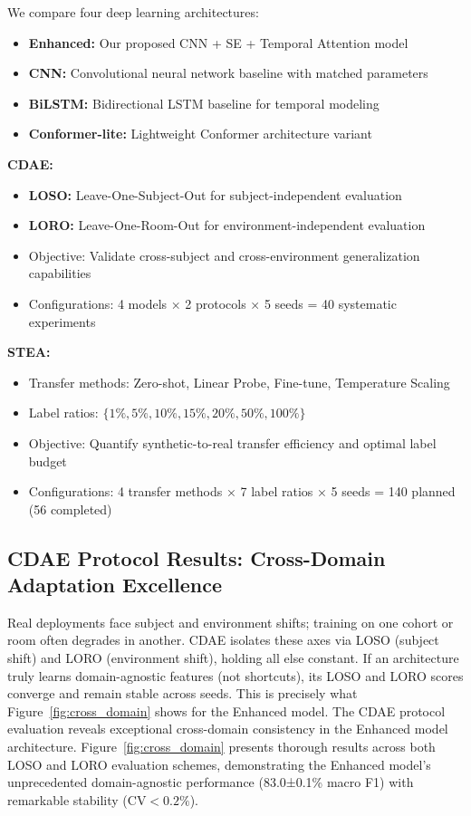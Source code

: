 \documentclass[journal]{IEEEtran}
\begin{document}

We compare four deep learning architectures:
\begin{itemize}
\item \textbf{Enhanced:} Our proposed CNN + SE + Temporal Attention model
\item \textbf{CNN:} Convolutional neural network baseline with matched parameters
\item \textbf{BiLSTM:} Bidirectional LSTM baseline for temporal modeling
\item \textbf{Conformer-lite:} Lightweight Conformer architecture variant
\end{itemize}


\textbf{CDAE:}
\begin{itemize}
\item \textbf{LOSO:} Leave-One-Subject-Out for subject-independent evaluation
\item \textbf{LORO:} Leave-One-Room-Out for environment-independent evaluation
\item Objective: Validate cross-subject and cross-environment generalization capabilities
\item Configurations: 4 models × 2 protocols × 5 seeds = 40 systematic experiments
\end{itemize}

\textbf{STEA:}
\begin{itemize}
\item Transfer methods: Zero-shot, Linear Probe, Fine-tune, Temperature Scaling
\item Label ratios: $\{1\%, 5\%, 10\%, 15\%, 20\%, 50\%, 100\%\}$
\item Objective: Quantify synthetic-to-real transfer efficiency and optimal label budget
\item Configurations: 4 transfer methods × 7 label ratios × 5 seeds = 140 planned (56 completed)
\end{itemize}

\subsection{CDAE Protocol Results: Cross-Domain Adaptation Excellence}

Real deployments face subject and environment shifts; training on one cohort or room often degrades in another. %
CDAE isolates these axes via LOSO (subject shift) and LORO (environment shift), holding all else constant. %
If an architecture truly learns domain-agnostic features (not shortcuts), its LOSO and LORO scores converge and remain stable across seeds. This is precisely what Figure~\ref{fig:cross_domain} shows for the Enhanced model.
The CDAE protocol evaluation reveals exceptional cross-domain consistency in the Enhanced model architecture. Figure~\ref{fig:cross_domain} presents thorough results across both LOSO and LORO evaluation schemes, demonstrating the Enhanced model's unprecedented domain-agnostic performance (83.0±0.1\% macro F1) with remarkable stability ($\text{CV}<0.2\%$).
\end{document}

